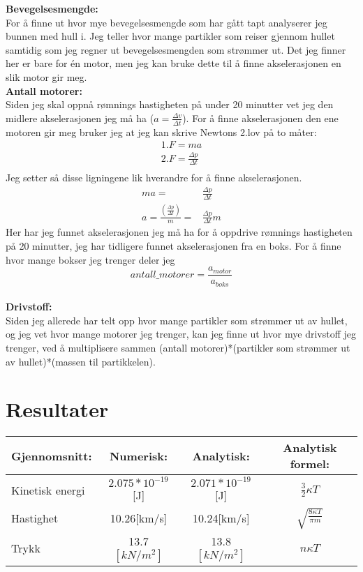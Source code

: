 \documentclass[12pt,preprint]{aastex6}
\begin{document}
\textbf{Bevegelsesmengde:}\\
For å finne ut hvor mye bevegelsesmengde som har gått tapt analyserer jeg bunnen med hull i. Jeg teller hvor mange partikler som reiser gjennom hullet samtidig som jeg regner ut bevegelsesmengden som strømmer ut. Det jeg finner her er bare for én motor, men jeg kan bruke dette til å finne akselerasjonen en slik motor gir meg. \\

\textbf{Antall motorer:}\\
Siden jeg skal oppnå rømnings hastigheten på under 20 minutter vet jeg den midlere akselerasjonen jeg må ha ($a=\frac{\Delta v}{\Delta t}$). For å finne akselerasjonen den ene motoren gir meg bruker jeg at jeg kan skrive Newtons 2.lov på to måter: 
\begin{align*}
1.F= ma\\
2.F = \frac{\Delta p}{\Delta t}\\
\end{align*}
Jeg setter så disse ligningene lik hverandre for å finne akselerasjonen.
\begin{align*}
ma =& \frac{\Delta p}{\Delta t}\\
a = \frac{\left(\frac{\Delta p}{\Delta t}\right)}{m} =& \frac{\Delta p}{\Delta t}m
\end{align*}
Her har jeg funnet akselerasjonen jeg må ha for å oppdrive rømnings hastigheten på 20 minutter, jeg har tidligere funnet akselerasjonen fra en boks. For å finne hvor mange bokser jeg trenger deler jeg 
$$antall\_motorer = \frac{a_{motor}}{a_{boks}}$$ 
\\
\textbf{Drivstoff:}\\
Siden jeg allerede har telt opp hvor mange partikler som strømmer ut av hullet, og jeg vet hvor mange motorer jeg trenger, kan jeg finne ut hvor mye drivstoff jeg trenger, ved å multiplisere sammen (antall motorer)*(partikler som strømmer ut av hullet)*(massen til partikkelen).

\newpage

\section{Resultater}
\begin{center}
  \begin{tabular}{ | l | c | c | c |}
    \hline
    Gjennomsnitt: & Numerisk: & Analytisk: & Analytisk formel:\\ \hline
    Kinetisk energi & $2.075*10^{-19}$ [J] & $2.071*10^{-19}$ [J] & $\frac{3}{2}\kappa T$ \\ \hline
    Hastighet & 10.26[km/s] & 10.24[km/s] & $\sqrt{\frac{8\kappa T}{\pi m}}$\\ \hline
    Trykk & 13.7 $[kN/m^2]$ & 13.8 $[kN/m^2]$ & $n\kappa T$ \\
    \hline
  \end{tabular}
\end{center}
\end{document}

